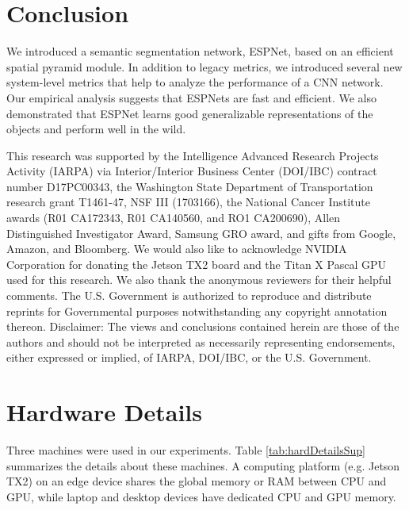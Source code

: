 \documentclass[runningheads]{llncs}
\begin{document}
\section{Conclusion}
We introduced a semantic segmentation network, ESPNet, based on an efficient spatial pyramid module. In addition to legacy metrics, we introduced several new system-level metrics that help to analyze the performance of a CNN network. Our empirical analysis suggests that ESPNets are fast and efficient. We also demonstrated that ESPNet learns good generalizable representations of the objects and perform well in the wild. 

\begin{small}
	\vspace{0.2cm}
 This research was supported by the Intelligence Advanced Research Projects Activity (IARPA) via Interior/Interior Business Center (DOI/IBC) contract number D17PC00343, the Washington  State  Department  of  Transportation  research grant T1461-47, NSF III (1703166), the National Cancer Institute awards (R01 CA172343, R01 CA140560, and RO1 CA200690), Allen Distinguished Investigator Award, Samsung GRO award, and gifts from Google, Amazon, and Bloomberg. We would also like to acknowledge NVIDIA Corporation for donating the Jetson TX2 board and the Titan X Pascal GPU used for this research. We also thank the anonymous reviewers for their helpful comments. The U.S. Government is authorized to reproduce and distribute reprints for Governmental purposes notwithstanding any copyright annotation thereon. Disclaimer: The views and conclusions contained herein are those of the authors and should not be interpreted as necessarily representing endorsements, either expressed or implied, of IARPA, DOI/IBC, or the U.S. Government.
\end{small}




\clearpage

\appendix

\section{Hardware Details}
\label{sec:hardwareDetailsSup}
Three machines were used in our experiments. Table \ref{tab:hardDetailsSup} summarizes the details about these machines. A computing platform (e.g. Jetson TX2) on an edge device shares the global memory or RAM between CPU and GPU, while laptop and desktop devices have dedicated CPU and GPU memory.
\end{document}
